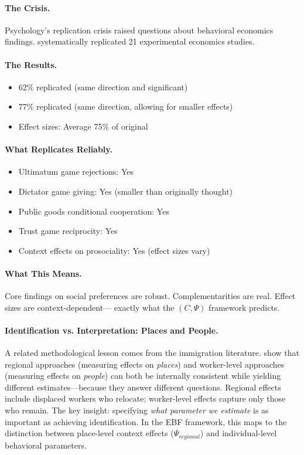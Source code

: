 \paragraph{The Crisis.}
Psychology's replication crisis \citep{camloewetAl2016} raised questions about behavioral economics findings.
\citet{camerer2018evaluating} systematically replicated 21 experimental economics studies.

\paragraph{The Results.}
\begin{itemize}
  \item 62\% replicated (same direction and significant)
  \item 77\% replicated (same direction, allowing for smaller effects)
  \item Effect sizes: Average 75\% of original
\end{itemize}

\paragraph{What Replicates Reliably.}
\begin{itemize}
  \item Ultimatum game rejections: Yes
  \item Dictator game giving: Yes (smaller than originally thought)
  \item Public goods conditional cooperation: Yes
  \item Trust game reciprocity: Yes
  \item Context effects on prosociality: Yes (effect sizes vary)
\end{itemize}

\paragraph{What This Means.}
Core findings on social preferences are robust.
Complementarities are real. Effect sizes are context-dependent---
exactly what the $(C, \Psi)$ framework predicts.

\paragraph{Identification vs. Interpretation: Places and People.}
A related methodological lesson comes from the immigration literature. \citet{PAP-dustmann2025immigration} show that regional approaches (measuring effects on \textit{places}) and worker-level approaches (measuring effects on \textit{people}) can both be internally consistent while yielding different estimates---because they answer different questions. Regional effects include displaced workers who relocate; worker-level effects capture only those who remain. The key insight: specifying \textit{what parameter we estimate} is as important as achieving identification. In the EBF framework, this maps to the distinction between place-level context effects ($\Psi_{regional}$) and individual-level behavioral parameters.

